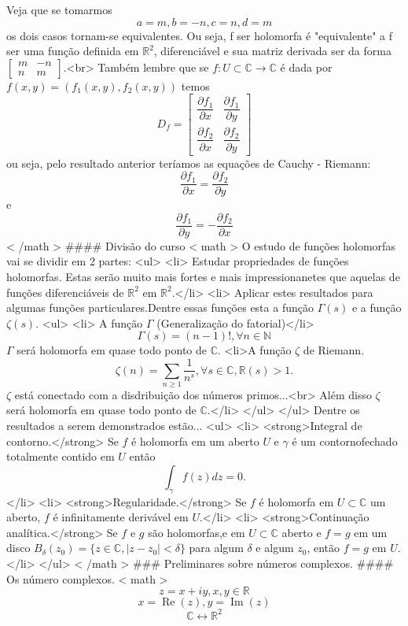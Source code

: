 Veja que se tomarmos $$a=m,b=-n,c=n,d=m$$ os dois casos tornam-se equivalentes. Ou seja, f ser holomorfa é "equivalente" a f ser uma função definida em $\mathbb{R}^2$, diferenciável e sua matriz derivada ser da forma
$
\left[
\begin{array}{cc}
m&-n\\
n&m
\end{array}
\right].
$<br>
Também lembre que se $f:U \subset \mathbb{C} \rightarrow \mathbb{C}$
é dada por $f(x,y) = (f_1(x,y),f_2(x,y))$ temos $$D_f =
\left[
\begin{array}{cc}
\dfrac{\partial f_1}{\partial x}&\dfrac{\partial f_1}{\partial y}\\
\dfrac{\partial f_2}{\partial x}&\dfrac{\partial f_2}{\partial y}
\end{array}
\right]
$$
ou seja, pelo resultado anterior teríamos as equações de Cauchy - Riemann:$$\dfrac{\partial f_1}{\partial x}= \dfrac{\partial f_2}{\partial y}$$ e $$\dfrac{\partial f_1}{\partial y}= -\dfrac{\partial f_2}{\partial x}$$
{{< /math >}}
#### Divisão do curso
{{< math >}}
O estudo de funções holomorfas vai se dividir em 2 partes:
<ul>
<li> Estudar propriedades de funções holomorfas. Estas serão muito mais fortes
e mais impressionanetes que aquelas de funções diferenciáveis de $\mathbb{R}^2$
em $\mathbb{R}^2$.</li>
<li> Aplicar estes resultados para algumas funções particulares.Dentre essas funções esta a função $\Gamma (s)$ e a função $\zeta(s)$.
<ul>
<li> A função $\Gamma$ (Generalização do fatorial)</li>
$$\Gamma(s) = (n-1)!, \forall n \in \mathbb{N}$$
$\Gamma$ será holomorfa em quase todo ponto de $\mathbb{C}$.
<li>A função $\zeta$ de Riemann.
$$\zeta (n) = \sum _ {n \geqslant 1}\dfrac{1}{n^s},\forall s \in \mathbb{C},\mathbb{R}(s)>1.$$ $\zeta$ está conectado com a disdribuição dos números primos...<br>
Além disso $\zeta$ será holomorfa em quase todo ponto de $\mathbb{C}$.</li>
</ul>
</ul>
Dentre os resultados a serem demonstrados estão...
<ul>
<li> <strong>Integral de contorno.</strong> Se $f$ é holomorfa em um aberto $U$ e $\gamma$ é um contornofechado totalmente contido em $U$ então $$\int_{\gamma}f(z)dz=0.$$</li>
<li> <strong>Regularidade.</strong> Se $f$ é holomorfa em $U \subset \mathbb{C}$ um aberto, $f$ é infinitamente derivável em $U$.</li>
<li> <strong>Continuação analítica.</strong> Se $f$ e $g$ são holomorfas,e em $U \subset \mathbb{C}$ aberto e $f=g$ em um disco $B_{\delta}(z_0)=\{z \in \mathbb{C},|z-z_0|<\delta\}$ para algum $\delta$ e algum $z_0$, então $f=g$ em $U$.</li>
</ul>
{{< /math >}}
### Preliminares sobre números complexos.
#### Os número complexos.
{{< math >}}
$$z= x+iy , x,y \in \mathbb{R}$$
$$x = \operatorname{Re}(z) , y = \operatorname{Im}(z)$$
$$\mathbb{C} \leftrightarrow \mathbb{R}^2$$

